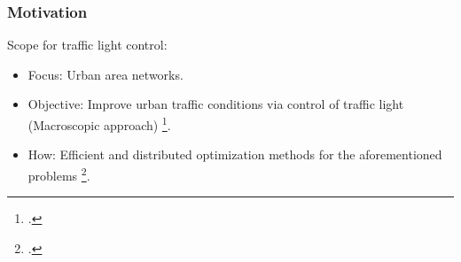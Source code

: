\begin{frame}
    \frametitle{Motivation}
    Scope for traffic light control:
    \begin{itemize}
      \item Focus: Urban area networks.
      \item Objective: Improve urban traffic conditions via control of traffic light (Macroscopic approach) \footcite{grandinetti2015}.
      \item How: Efficient and distributed optimization methods for the aforementioned problems \footcite{grandinetti2015a}.
    \end{itemize}
\end{frame}